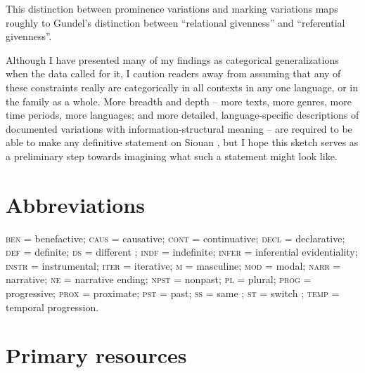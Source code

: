 \documentclass[output=paper]{LSP/langsci}
\begin{document}
This distinction between prominence variations and marking variations maps roughly to Gundel’s \citeyearpar{Gundel2003, Gundel1988} distinction between “relational givenness” and  “referential givenness”.

Although I have presented many of my findings as categorical generalizations when the data called for it, I caution readers away from assuming that any of these constraints really are categorically  in all contexts in any one language, or in the family as a whole. More breadth and depth -- more texts, more genres, more time periods, more languages; and more detailed, language-specific descriptions of documented variations with information-structural meaning -- are required to be able to make any definitive statement on Siouan , but I hope this sketch serves as a preliminary step towards imagining what such a statement might look like.

\section* {Abbreviations}

\textsc{ben} = benefactive; \textsc{caus} = causative; \textsc{cont} = continuative; \textsc{decl} = declarative; \textsc{def} = definite; \textsc{ds} =  different ; \textsc{indf} = indefinite; \textsc{infer} = inferential evidentiality; \textsc{instr} = instrumental; \textsc{iter} = iterative; \textsc{m} =  masculine; \textsc{mod} = modal; \textsc{narr} = narrative; \textsc{ne} = narrative ending; \textsc{npst} = nonpast; \textsc{pl} = plural; \textsc{prog} =  progressive; \textsc{prox} = proximate; \textsc{pst} = past; \textsc{ss} = same ; \textsc{st} = switch ; \textsc{temp} = temporal progression.

\section*{Primary resources}
\end{document}
